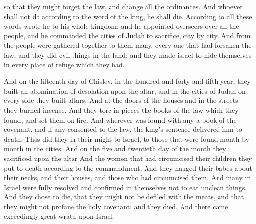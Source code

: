 {so that they might forget the law, and change all the ordinances.
And whoever shall not do according to the word of the king, he shall die.
According to all these words wrote he to his whole kingdom; and he appointed overseers over all the people, and he commanded the cities of Judah to sacrifice, city by city.
And from the people were gathered together to them many, every one that had forsaken the law; and they did evil things in the land;
and they made israel to hide themselves in every place of refuge which they had.
\par }{\PP {}And on the fifteenth day of Chislev, in
 the hundred and forty and fifth year, they built an abomination of desolation upon the
 altar, and in the cities of Judah on every side they built
{}
 altars.
And at the doors of the houses and in the streets they burned incense.
And they tore in pieces the books of the law which they found, and set them on fire.
And wherever was found with any a book of the covenant, and if any consented to the law, the king’s sentence delivered him to death.
Thus did they in their might to Israel, to those that were found month by month in the cities.
And on the five and twentieth day of the month they sacrificed upon the
{}
 altar
{}
And
 the women that had circumcised their children they put to death according to the commandment.
And they hanged their babes about their necks, and
{} their houses, and those who had circumcised them.
And many in Israel were fully resolved and confirmed in themselves not to eat unclean things.
And
 they chose to die, that they might not be defiled with the meats, and that they might not profane the holy covenant: and they died.
And there came exceedingly great wrath upon Israel.

}
